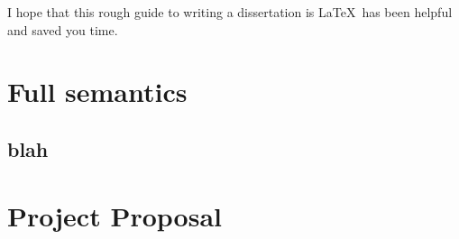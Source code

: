 \documentclass[12pt,twoside,notitlepage]{report}
\begin{document}
I hope that this rough guide to writing a dissertation is \LaTeX\ has
been helpful and saved you time.




\cleardoublepage



\cleardoublepage

\appendix

\chapter{Full semantics}
\label{chap:fullsemantics}


\section{blah}









\cleardoublepage

\chapter{Project Proposal}


\end{document}
